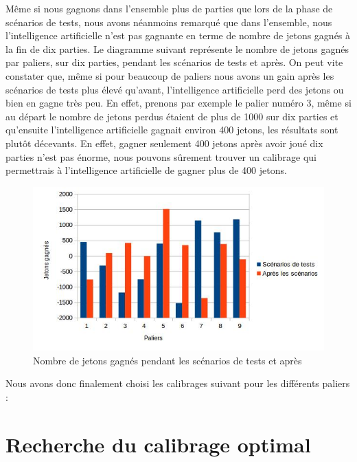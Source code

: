 \documentclass{report}
\begin{document}
Même si nous gagnons dans l'ensemble plus de parties que lors de la phase de scénarios de tests, nous avons néanmoins remarqué que dans l'ensemble, nous l'intelligence artificielle n'est pas gagnante en terme de nombre de jetons gagnés à la fin de dix parties. Le diagramme suivant représente le nombre de jetons gagnés par paliers, sur dix parties, pendant les scénarios de tests et après. On peut vite constater que, même si pour beaucoup de paliers nous avons un gain après les scénarios de tests plus élevé qu'avant, l'intelligence artificielle perd des jetons ou bien en gagne très peu. En effet, prenons par exemple le palier numéro 3, même si au départ le nombre de jetons perdus étaient de plus de 1000 sur dix parties et qu'ensuite l'intelligence artificielle gagnait environ 400 jetons, les résultats sont plutôt décevants. En effet, gagner seulement 400 jetons après avoir joué dix parties n'est pas énorme, nous pouvons sûrement trouver un calibrage qui permettrais à l'intelligence artificielle de gagner plus de 400 jetons.\par


\begin{figure}[H]
	\begin{center}
		\includegraphics[scale=0.5]{./imagesRapport/PremierCalibrageComparaisonJetonsGagnees.jpg}
	\end{center}
	\caption{Nombre de jetons gagnés pendant les scénarios de tests et après}
\end{figure}

Nous avons donc finalement choisi les calibrages suivant pour les différents paliers :


\section{Recherche du calibrage optimal}
\end{document}
